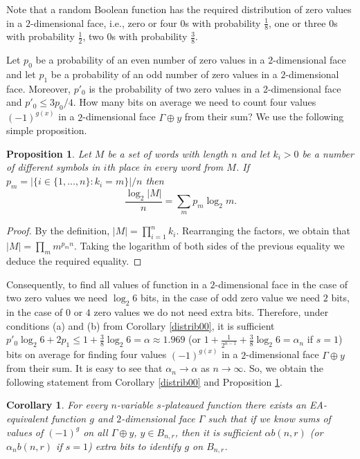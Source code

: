 \documentclass[a4paper,12pt]{article}   %
\newtheorem{proposition}{Proposition}
\newtheorem{corollary}{Corollary}
\begin{document}
Note that a random Boolean function has the required distribution of
zero values in a $2$-dimensional face, i.e., zero or four $0$s with
probability $\frac18$, one or three $0$s with probability $\frac12$,
two $0$s with probability $\frac38$.

Let $p_0$ be a probability of an even number of zero values in a
$2$-dimensional face and let $p_1$
 be a probability of an odd number of zero values in a
$2$-dimensional face. Moreover,  $p'_0$ is the  probability of two
zero values in a $2$-dimensional face and $p'_0\leq 3p_0/4$. How
many bits on average we need to count four values $(-1)^{g(x)}$ in a
$2$-dimensional face  $\Gamma\oplus y$ from their sum? We use the
following simple proposition.


\begin{proposition}\label{dist33}
Let $M$ be a set of words with length $n$ and let $k_i>0$ be a
number of different symbols in $i$th place in every word from $M$.
If $p_m=|\{i\in \{1,\dots,n\} : k_i=m\}|/n$ then
$$\frac{\log_2|M|}{n}= \sum_mp_m\log_2m.$$
\end{proposition}
\begin{proof}
By the definition, $|M|=\prod^n_{i=1}k_i$. Rearranging the factors,
we obtain that $|M|=\prod_m m^{p_mn}$. Taking the logarithm of both
sides of the previous equality  we deduce the required equality.
\end{proof}


Consequently, to find all  values of function in a $2$-dimensional
face in the case of two zero values we need $\log_2 6$ bits, in the
case of odd zero value we need $2$ bits, in the case of $0$ or $4$
zero values we do not need extra bits.
 Therefore,  under conditions (a) and (b) from  Corollary
\ref{distrib00}, it is sufficient  $p'_0\log_2 6+2p_1\leq
1+\frac{3}{8}\log_2 6 =\alpha\approx 1.969$  (or
$1+\frac{1}{2^{n-1}}+\frac{3}{8}\log_2 6=\alpha_n$ if $s=1$) bits on
average for finding four values $(-1)^{g(x)}$ in a $2$-dimensional
face $\Gamma\oplus y$ from their sum. It is easy to see that
$\alpha_n\rightarrow\alpha$ as $n\rightarrow\infty$. So, we obtain
the following statement from Corollary \ref{distrib00} and
Proposition \ref{dist33}.


\begin{corollary}\label{distrib001}
For every $n$-variable $s$-plateaued function there exists an
EA-equivalent function $g$ and $2$-dimensional face $\Gamma$ such
that if we know sums of values of $(-1)^g$ on all $\Gamma\oplus y$,
$y\in B_{n,r}$, then it is sufficient $\alpha b(n,r)$ (or $\alpha_n
b(n,r)$ if $s=1$) extra bits to  identify $g$ on $B_{n,r}$.
\end{corollary}
\end{document}
